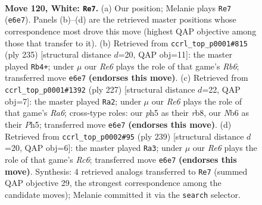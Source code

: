 \documentclass[11pt]{article}
\begin{document}
\clearpage

\begin{figure}[p]\centering
\begin{subfigure}{0.46\textwidth}\centering
\resizebox{\linewidth}{!}{%
\newchessgame
\chessboard[
  setfen={8/6p1/1N2Rpk1/7p/7P/6PK/r7/8 w - - 64 120},
  showmover=false,
  pgfstyle=straightmove, color=movearrow, markmove={e6-e7}
]}
\caption{}
\end{subfigure}\hfill
\begin{subfigure}{0.46\textwidth}\centering
\resizebox{\linewidth}{!}{%
\newchessgame
\chessboard[
  setfen={8/5pk1/5p2/2R4P/5KP1/1r3P2/8/8 b - - 70 118},
  showmover=false,
  pgfstyle=straightmove, color=movearrow, markmove={b3-b4}
]}
\caption{}
\end{subfigure}
\\[4pt]
\begin{subfigure}{0.46\textwidth}\centering
\resizebox{\linewidth}{!}{%
\newchessgame
\chessboard[
  setfen={1R6/6k1/6p1/5p1p/7P/r5P1/5PK1/8 b - - 5 114},
  showmover=false,
  pgfstyle=straightmove, color=movearrow, markmove={a3-a2}
]}
\caption{}
\end{subfigure}\hfill
\begin{subfigure}{0.46\textwidth}\centering
\resizebox{\linewidth}{!}{%
\newchessgame
\chessboard[
  setfen={5k2/5p2/4pP2/4P3/4PK2/2r5/6R1/8 b - - 56 120},
  showmover=false,
  pgfstyle=straightmove, color=movearrow, markmove={c3-a3}
]}
\caption{}
\end{subfigure}
\caption{\textbf{Move 120, White: \texttt{Re7}.} (a) Our position; Melanie plays \texttt{Re7} (\texttt{e6e7}). Panels (b)--(d) are the retrieved master positions whose correspondence most drove this move (highest QAP objective among those that transfer to it). (b) Retrieved from \texttt{ccrl\_top\_p0001\#815} (ply 235) [structural distance $d$=20, QAP obj=11]: the master played \texttt{Rb4+}; under $\mu$ our \emph{Re6} plays the role of that game's \emph{Rb6}; transferred move \texttt{e6e7} \textbf{(endorses this move)}. (c) Retrieved from \texttt{ccrl\_top\_p0001\#1392} (ply 227) [structural distance $d$=22, QAP obj=7]: the master played \texttt{Ra2}; under $\mu$ our \emph{Re6} plays the role of that game's \emph{Ra6}; cross-type roles: our \emph{p}h5 as their \emph{r}b8, our \emph{N}b6 as their \emph{P}h5; transferred move \texttt{e6e7} \textbf{(endorses this move)}. (d) Retrieved from \texttt{ccrl\_top\_p0002\#95} (ply 239) [structural distance $d$=20, QAP obj=6]: the master played \texttt{Ra3}; under $\mu$ our \emph{Re6} plays the role of that game's \emph{Rc6}; transferred move \texttt{e6e7} \textbf{(endorses this move)}. Synthesis: 4 retrieved analogs transferred to \texttt{Re7} (summed QAP objective 29, the strongest correspondence among the candidate moves); Melanie committed it via the \texttt{search} selector.}
\label{fig:thought-m238}
\end{figure}
\end{document}
